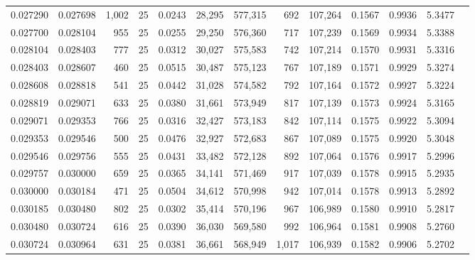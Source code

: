\begin{tabular}{rrrrrrrrrrrrr}
0.027290 & 0.027698 & 1,002 &  25 &                                     0.0243 &  28,295 & 577,315 &     692 & 107,264 & 0.1567 & 0.9936 & 5.3477 \\
0.027700 & 0.028104 &   955 &  25 &                                     0.0255 &  29,250 & 576,360 &     717 & 107,239 & 0.1569 & 0.9934 & 5.3388 \\
0.028104 & 0.028403 &   777 &  25 &                                     0.0312 &  30,027 & 575,583 &     742 & 107,214 & 0.1570 & 0.9931 & 5.3316 \\
0.028403 & 0.028607 &   460 &  25 &                                     0.0515 &  30,487 & 575,123 &     767 & 107,189 & 0.1571 & 0.9929 & 5.3274 \\
0.028608 & 0.028818 &   541 &  25 &                                     0.0442 &  31,028 & 574,582 &     792 & 107,164 & 0.1572 & 0.9927 & 5.3224 \\
0.028819 & 0.029071 &   633 &  25 &                                     0.0380 &  31,661 & 573,949 &     817 & 107,139 & 0.1573 & 0.9924 & 5.3165 \\
0.029071 & 0.029353 &   766 &  25 &                                     0.0316 &  32,427 & 573,183 &     842 & 107,114 & 0.1575 & 0.9922 & 5.3094 \\
0.029353 & 0.029546 &   500 &  25 &                                     0.0476 &  32,927 & 572,683 &     867 & 107,089 & 0.1575 & 0.9920 & 5.3048 \\
0.029546 & 0.029756 &   555 &  25 &                                     0.0431 &  33,482 & 572,128 &     892 & 107,064 & 0.1576 & 0.9917 & 5.2996 \\
0.029757 & 0.030000 &   659 &  25 &                                     0.0365 &  34,141 & 571,469 &     917 & 107,039 & 0.1578 & 0.9915 & 5.2935 \\
0.030000 & 0.030184 &   471 &  25 &                                     0.0504 &  34,612 & 570,998 &     942 & 107,014 & 0.1578 & 0.9913 & 5.2892 \\
0.030185 & 0.030480 &   802 &  25 &                                     0.0302 &  35,414 & 570,196 &     967 & 106,989 & 0.1580 & 0.9910 & 5.2817 \\
0.030480 & 0.030724 &   616 &  25 &                                     0.0390 &  36,030 & 569,580 &     992 & 106,964 & 0.1581 & 0.9908 & 5.2760 \\
0.030724 & 0.030964 &   631 &  25 &                                     0.0381 &  36,661 & 568,949 &   1,017 & 106,939 & 0.1582 & 0.9906 & 5.2702 \\

\end{tabular}
